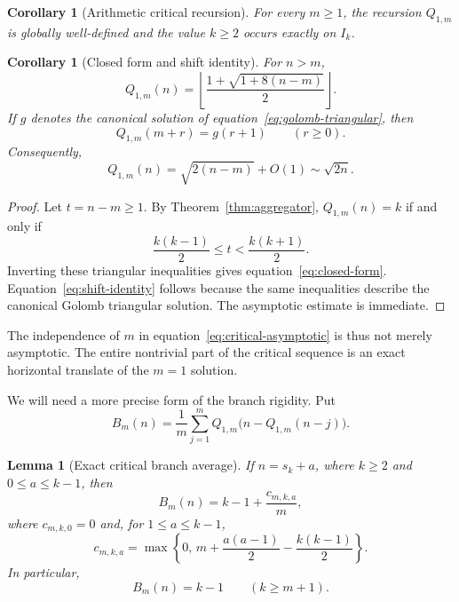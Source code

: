 \documentclass[11pt]{article}
\newtheorem{lemma}[theorem]{Lemma}
\newtheorem{corollary}[theorem]{Corollary}
\theoremstyle{definition}
\theoremstyle{remark}
\newcommand{\floor}[1]{\left\lfloor #1\right\rfloor}
\begin{document}
\begin{corollary}[Arithmetic critical recursion]\label{cor:arithmetic}
For every $m\ge1$, the recursion $Q_{1,m}$ is globally well-defined and the
value $k\ge2$ occurs exactly on $I_k$.
\end{corollary}

\begin{corollary}[Closed form and shift identity]\label{cor:closed-form}
For $n>m$,
\begin{equation}\label{eq:closed-form}
Q_{1,m}(n)
=
\floor{\frac{1+\sqrt{1+8(n-m)}}2}.
\end{equation}
If $g$ denotes the canonical solution of
equation~\eqref{eq:golomb-triangular}, then
\begin{equation}\label{eq:shift-identity}
Q_{1,m}(m+r)=g(r+1)
\qquad (r\ge0).
\end{equation}
Consequently,
\begin{equation}\label{eq:critical-asymptotic}
Q_{1,m}(n)=\sqrt{2(n-m)}+O(1)\sim\sqrt{2n}.
\end{equation}
\end{corollary}

\begin{proof}
Let $t=n-m\ge1$.  By Theorem~\ref{thm:aggregator}, $Q_{1,m}(n)=k$ if and
only if
\[
\frac{k(k-1)}2\le t<\frac{k(k+1)}2.
\]
Inverting these triangular inequalities gives
equation~\eqref{eq:closed-form}.  Equation~\eqref{eq:shift-identity} follows
because the same inequalities describe the canonical Golomb triangular
solution.  The asymptotic estimate is immediate.
\end{proof}

The independence of $m$ in equation~\eqref{eq:critical-asymptotic} is thus
not merely asymptotic.  The entire nontrivial part of the critical sequence
is an exact horizontal translate of the $m=1$ solution.

We will need a more precise form of the branch rigidity.  Put
\begin{equation}\label{eq:critical-branch-average}
B_m(n)
=
\frac1m\sum_{j=1}^{m}
Q_{1,m}\bigl(n-Q_{1,m}(n-j)\bigr).
\end{equation}

\begin{lemma}[Exact critical branch average]\label{lem:branch-average}
If $n=s_k+a$, where $k\ge2$ and $0\le a\le k-1$, then
\begin{equation}\label{eq:branch-count}
B_m(n)=k-1+\frac{c_{m,k,a}}m,
\end{equation}
where $c_{m,k,0}=0$ and, for $1\le a\le k-1$,
\begin{equation}\label{eq:c-count}
c_{m,k,a}
=
\max\left\{0,\,m+\frac{a(a-1)}2-\frac{k(k-1)}2\right\}.
\end{equation}
In particular,
\begin{equation}\label{eq:branch-collapse}
B_m(n)=k-1
\qquad (k\ge m+1).
\end{equation}
\end{lemma}
\end{document}
